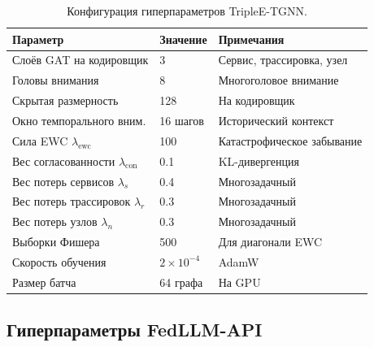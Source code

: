 \begin{table}[htbp]
\centering
\caption{Конфигурация гиперпараметров TripleE-TGNN.}
\label{tab:hp_triplee}
\begin{tabular}{lll}
\toprule
Параметр & Значение & Примечания \\
\midrule
Слоёв GAT на кодировщик    & 3     & Сервис, трассировка, узел \\
Головы внимания            & 8     & Многоголовое внимание \\
Скрытая размерность        & 128   & На кодировщик \\
Окно темпорального вним.   & 16 шагов & Исторический контекст \\
Сила EWC $\lambda_{\mathrm{ewc}}$ & 100 & Катастрофическое забывание \\
Вес согласованности $\lambda_{\mathrm{con}}$ & 0.1 & KL-дивергенция \\
Вес потерь сервисов $\lambda_s$ & 0.4 & Многозадачный \\
Вес потерь трассировок $\lambda_r$  & 0.3 & Многозадачный \\
Вес потерь узлов $\lambda_n$   & 0.3 & Многозадачный \\
Выборки Фишера             & 500   & Для диагонали EWC \\
Скорость обучения          & $2\times10^{-4}$ & AdamW \\
Размер батча               & 64 графа & На GPU \\
\bottomrule
\end{tabular}
\end{table}


\subsection{Гиперпараметры FedLLM-API}
\label{app:hp_fedllm}

